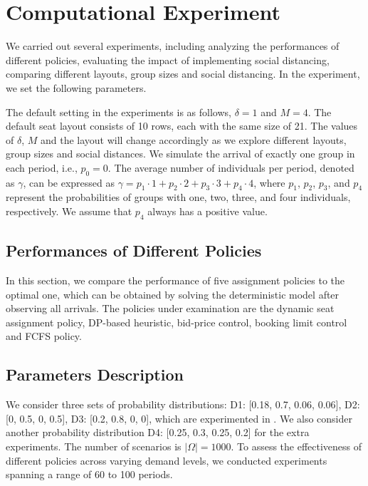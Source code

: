 \section{Computational Experiment}
We carried out several experiments, including analyzing the performances of different policies, evaluating the impact of implementing social distancing, comparing different layouts, group sizes and social distancing. In the experiment, we set the following parameters. 

The default setting in the experiments is as follows, $\delta =1$ and $M =4$. The default seat layout consists of 10 rows, each with the same size of 21. The values of $\delta$, $M$ and the layout will change accordingly as we explore different layouts, group sizes and social distances.
We simulate the arrival of exactly one group in each period, i.e., $p_0 = 0$. The average number of individuals per period, denoted as $\gamma$, can be expressed as $\gamma = p_1 \cdot 1 + p_2 \cdot 2 + p_3 \cdot 3 + p_4 \cdot 4$, where $p_1$, $p_2$, $p_3$, and $p_4$ represent the probabilities of groups with one, two, three, and four individuals, respectively. We assume that $p_4$ always has a positive value.

\subsection{Performances of Different Policies}
In this section, we compare the performance of five assignment policies to the optimal one, which can be obtained by solving the deterministic model after observing all arrivals. The policies under examination are the dynamic seat assignment policy, DP-based heuristic, bid-price control, booking limit control and FCFS policy.



\subsection*{Parameters Description}
We consider three sets of probability distributions: D1: [0.18, 0.7, 0.06, 0.06], D2: [0, 0.5, 0, 0.5], D3: [0.2, 0.8, 0, 0], which are experimented in \cite{blom2022filling}. We also consider another probability distribution D4: [0.25, 0.3, 0.25, 0.2] for the extra experiments. The number of scenarios is $|\Omega| = 1000$. To assess the effectiveness of different policies across varying demand levels, we conducted experiments spanning a range of 60 to 100 periods. 


